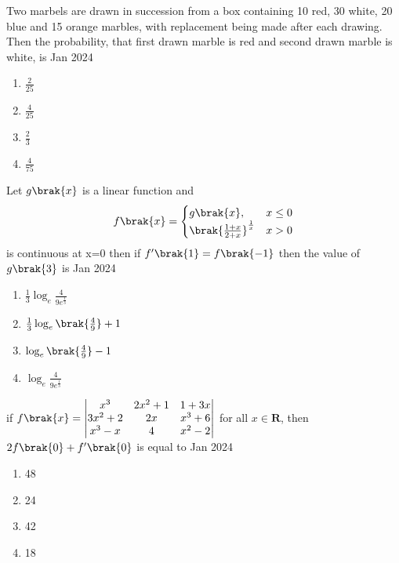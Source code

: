 \iffalse
  \title{Assignment}
  \author{EE24BTECH11038}
  \section{mcq-single}
\fi 
\item Two marbels are drawn in succession from a box containing 10 red, 30 white, 20 blue and 15 orange marbles, with replacement being made after each drawing. Then the probability, that first drawn marble is red and second drawn marble is white, is \hfill{Jan 2024}
\begin{enumerate}
    \item $\frac{2}{25}$
    \item $\frac{4}{25}$
    \item $\frac{2}{3}$
    \item $\frac{4}{75}$
\end{enumerate}
\bigskip
\item Let $g\brak{x}$ is a linear function and
\begin{align*}
    f\brak{x}=
    \begin{cases}
        g\brak{x}, \,\,\, &x\leq0\\
        \brak{\frac{1+x}{2+x}}^\frac{1}{x} &x>0
    \end{cases}
\end{align*}
is continuous at  x=0 then if $f'\brak{1}=f\brak{-1}$ then the value of $g\brak{3}$ is \hfill{Jan 2024}
\begin{enumerate}
    \item $\frac{1}{3}\log_{e}\frac{4}{9e^{\frac{1}{3}}}$\\
    \item $\frac{1}{3}\log_{e}\brak{\frac{4}{9}}+1$\\
    \item $\log_{e}\brak{\frac{4}{9}}-1$\\
    \item $\log_{e}\frac{4}{9e^{\frac{1}{3}}}$
\end{enumerate}
\bigskip
\item if $f\brak{x}=\begin{vmatrix}
x^3 & 2x^2 + 1 & 1 + 3x \\
3x^2 + 2 & 2x & x^3 + 6 \\
x^3 - x & 4 & x^2 - 2
\end{vmatrix}$ 
for all $x\in \mathbf{R}$, then $2f\brak{0}+f'\brak{0}$ is equal to \hfill{Jan 2024}
\begin{enumerate}
    \item 48
    \item 24
    \item 42
    \item 18
\end{enumerate}
